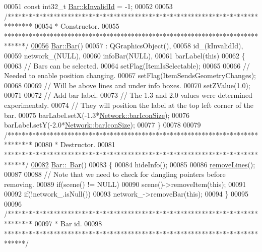 \begin{DoxyCode}
00051 \textcolor{keyword}{const} int32\_t \hyperlink{group___models_ga9919592c0397ed41448dfb20b607d738}{Bar::kInvalidId} = -1;
00052 
00053 \textcolor{comment}{/*******************************************************************************}
00054 \textcolor{comment}{ * Constructor.}
00055 \textcolor{comment}{ ******************************************************************************/}
\hypertarget{bar_8cpp_source_l00056}{}\hyperlink{group___models_ga9cae2188fcc6cce41caa7898c64548d1}{00056} \hyperlink{group___models_ga9cae2188fcc6cce41caa7898c64548d1}{Bar::Bar}()
00057   : QGraphicsObject(),
00058     id\_(kInvalidId),
00059     network\_(NULL),
00060     infoBar(NULL),
00061     barLabel(this)
00062 \{
00063   \textcolor{comment}{// Bars can be selected.}
00064   setFlag(ItemIsSelectable);
00065 
00066   \textcolor{comment}{// Needed to enable position changing.}
00067   setFlag(ItemSendsGeometryChanges);
00068 
00069   \textcolor{comment}{// Will be above lines and under info boxes.}
00070   setZValue(1.0);
00071 
00072   \textcolor{comment}{// Add bar label.}
00073   \textcolor{comment}{// The 1.3 and 2.0 values were determined experimentaly.}
00074   \textcolor{comment}{// They will position the label at the top left corner of the bar.}
00075   barLabel.setX(-1.3*\hyperlink{group___models_gaa334bbc93b3fde219840e95e23198b53}{Network::barIconSize});
00076   barLabel.setY(-2.0*\hyperlink{group___models_gaa334bbc93b3fde219840e95e23198b53}{Network::barIconSize});
00077 \}
00078 
00079 \textcolor{comment}{/*******************************************************************************}
00080 \textcolor{comment}{ * Destructor.}
00081 \textcolor{comment}{ ******************************************************************************/}
\hypertarget{bar_8cpp_source_l00082}{}\hyperlink{group___models_ga9c7ebea0c189423591741ac438985316}{00082} \hyperlink{group___models_ga9c7ebea0c189423591741ac438985316}{Bar::~Bar}()
00083 \{
00084   hideInfo();
00085 
00086   \hyperlink{group___models_ga4ea1a2074cb45968d80d6add571884a4}{removeLines}();
00087 
00088   \textcolor{comment}{// Note that we need to check for dangling pointers before removing.}
00089   \textcolor{keywordflow}{if}(scene() != NULL)
00090     scene()->removeItem(\textcolor{keyword}{this});
00091 
00092   \textcolor{keywordflow}{if}(!network\_.isNull())
00093     network\_->removeBar(\textcolor{keyword}{this});
00094 \}
00095 
00096 \textcolor{comment}{/*******************************************************************************}
00097 \textcolor{comment}{ * Bar id.}
00098 \textcolor{comment}{ ******************************************************************************/}

\end{DoxyCode}
